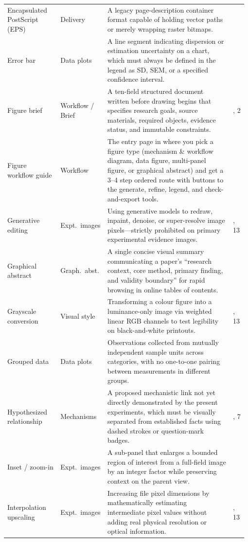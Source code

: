 \begin{longtable}{@{}>{\raggedright\arraybackslash}p{0.22\linewidth}>{\raggedright\arraybackslash}p{0.18\linewidth}>{\raggedright\arraybackslash}p{0.52\linewidth}>{\raggedright\arraybackslash}p{0.06\linewidth}@{}}
Encapsulated PostScript (EPS) & Delivery & A legacy page-description container format capable of holding vector paths or merely wrapping raster bitmaps. & 13 \\
Error bar & Data plots & A line segment indicating dispersion or estimation uncertainty on a chart, which must always be defined in the legend as SD, SEM, or a specified confidence interval. & 5 \\
Figure brief & Workflow / Brief & A ten-field structured document written before drawing begins that specifies research goals, source materials, required objects, evidence status, and immutable constraints. & 1, 2 \\
Figure workflow guide & Workflow & The entry page in \scidraw{} where you pick a figure type (mechanism \& workflow diagram, data figure, multi-panel figure, or graphical abstract) and get a 3--4 step ordered route with buttons to the generate, refine, legend, and check-and-export tools. & 1 \\
Generative editing & Expt.\ images & Using generative models to redraw, inpaint, denoise, or super-resolve image pixels---strictly prohibited on primary experimental evidence images. & 8, 13 \\
Graphical abstract & Graph.\ abst. & A single concise visual summary communicating a paper's ``research context, core method, primary finding, and validity boundary'' for rapid browsing in online tables of contents. & 10 \\
Grayscale conversion & Visual style & Transforming a colour figure into a luminance-only image via weighted linear RGB channels to test legibility on black-and-white printouts. & 4, 13 \\
Grouped data & Data plots & Observations collected from mutually independent sample units across categories, with no one-to-one pairing between measurements in different groups. & 5 \\
Hypothesized relationship & Mechanisms & A proposed mechanistic link not yet directly demonstrated by the present experiments, which must be visually separated from established facts using dashed strokes or question-mark badges. & 2, 7 \\
Inset / zoom-in & Expt.\ images & A sub-panel that enlarges a bounded region of interest from a full-field image by an integer factor while preserving context on the parent view. & 8 \\
Interpolation upscaling & Expt.\ images & Increasing file pixel dimensions by mathematically estimating intermediate pixel values without adding real physical resolution or optical information. & 8, 13 \\

\end{longtable}
